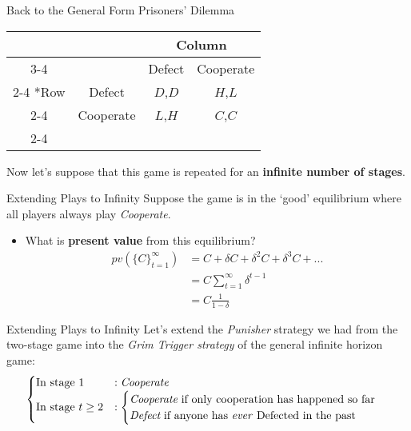 

\begin{frame}{Back to the General Form Prisoners' Dilemma}
  \begin{table}[!h]
    \centering
    \begin{tabular}{*{4}{c|}}
      \multicolumn{2}{c}{} & \multicolumn{2}{c}{Column} \\ \cline{3-4}
      \multicolumn{1}{c}{} &         & Defect  & Cooperate \\ \cline{2-4}
      \multirow{2}*{Row} &    Defect & $D$,$D$ & $H$,$L$   \\ \cline{2-4}
                         & Cooperate & $L$,$H$ & $C$,$C$   \\ \cline{2-4} 
    \end{tabular} 
  \end{table} 
  Now let's suppose that this game is repeated for an \textbf{infinite number of stages}.
\end{frame}

\begin{frame}{Extending Plays to Infinity}
  Suppose the game is in the `good' equilibrium where all players always play \textit{Cooperate}.
  \begin{itemize}
    \item What is \textbf{present value} from this equilibrium? 
    \begin{align*}
      pv\left(\{ C \}_{t=1}^{\infty}\right) & = C + \delta C + \delta^2 C + \delta^3 C + ... \\ 
         & = C \sum_{t=1}^{\infty} \delta^{t-1} \\
         & = C \frac{1}{1-\delta}
    \end{align*}
  \end{itemize}
\end{frame}

\begin{frame}{Extending Plays to Infinity}
   Let's extend the \textit{Punisher} strategy we had from the two-stage game 
   into the \textit{Grim Trigger strategy} of the general infinite horizon game:
  \begin{align*}
    \begin{cases}
      \text{In stage } 1 & : \textit{Cooperate} \\ 
      \text{In stage } t \geq 2 & : 
      \begin{cases}
        \textit{Cooperate} \text{  if only cooperation has happened so far} \\ 
        \textit{Defect} \text{  if anyone has \textit{ever} Defected in the past}
      \end{cases}
    \end{cases}
  \end{align*}
\end{frame}

